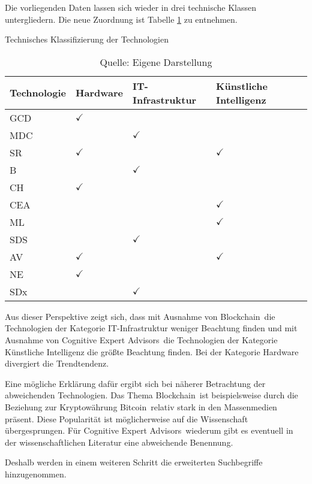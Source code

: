 Die vorliegenden Daten lassen sich wieder in drei technische Klassen untergliedern. Die neue Zuordnung ist Tabelle \ref{tab:class_tech_new} zu entnehmen.

\begin{table}
	\caption{Technisches Klassifizierung der Technologien}
	\selectfont
	\centering
	\label{tab:class_tech_new}
	\begin{tabularx}{\linewidth}{X|p{2cm}XX}
		Technologie & Hardware & IT-Infrastruktur & Künstliche Intelligenz \\
		\hline
		\acs{GCD} & $\checkmark$ & & \\
		\hline
		\acs{MDC} & & $\checkmark$ & \\
		\hline
		\acs{SR} & $\checkmark$ & & $\checkmark$ \\
		\hline
		\acs{B} & & $\checkmark$ & \\
		\hline
		\acs{CH} & $\checkmark$ & & \\
		\hline
		\acs{CEA} & & & $\checkmark$ \\
		\hline
		\acs{ML} & & & $\checkmark$ \\
		\hline
		\acs{SDS} & & $\checkmark$ & \\
		\hline
		\acs{AV} & $\checkmark$ & & $\checkmark$ \\
		\hline
		\acs{NE} & $\checkmark$ & & \\
		\hline
		\acs{SDx} & & $\checkmark$ & \\
		\hline
	\end{tabularx}
	\caption*{Quelle: Eigene Darstellung}
\end{table}

Aus dieser Perspektive zeigt sich, dass mit Ausnahme von \glqq Blockchain\grqq~die Technologien der Kategorie IT-Infrastruktur weniger Beachtung finden und mit Ausnahme von \glqq Cognitive Expert Advisors\grqq~die Technologien der Kategorie Künstliche Intelligenz die größte Beachtung finden. Bei der Kategorie Hardware divergiert die Trendtendenz.

Eine mögliche Erklärung dafür ergibt sich bei näherer Betrachtung der abweichenden Technologien. Das Thema \glqq Blockchain\grqq~ist beispielsweise durch die Beziehung zur Kryptowährung \glqq Bitcoin\grqq~relativ stark in den Massenmedien präsent. Diese Popularität ist möglicherweise auf die Wissenschaft übergesprungen. Für \glqq Cognitive Expert Advisors\grqq~wiederum gibt es eventuell in der wissenschaftlichen Literatur eine abweichende Benennung.

Deshalb werden in einem weiteren Schritt die erweiterten Suchbegriffe hinzugenommen.

